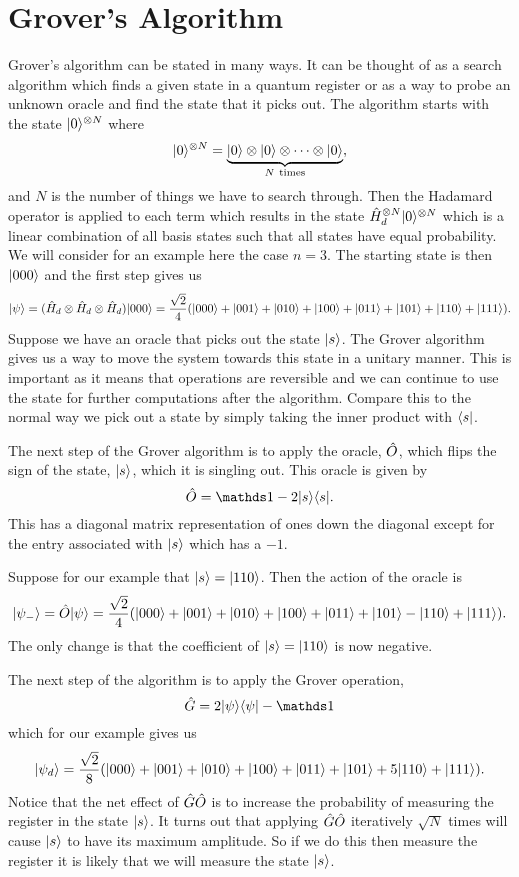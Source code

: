     \section{Grover's Algorithm}
    Grover's algorithm can be stated in many ways.
    It can be thought of as a search algorithm which finds a given state in a quantum register or as a way to probe an unknown oracle and find the state that it picks out.
    The algorithm starts with the state \(\vert {0} \rangle^{\otimes N}\) where
    \[\vert {0} \rangle^{\otimes N} = \underbrace{\vert {0} \rangle\otimes\vert {0} \rangle \otimes\dotsb\otimes \vert {0} \rangle}_{N~\text{times}},\]
    and \(N\) is the number of things we have to search through.
    Then the Hadamard operator is applied to each term which results in the state \(\hat{H}_d^{\otimes N} \vert {0} \rangle^{\otimes N}\) which is a linear combination of all basis states such that all states have equal probability.
    We will consider for an example here the case \(n = 3\).
    The starting state is then \(\vert {000} \rangle\) and the first step gives us
    \[\vert {\psi} \rangle = (\hat{H}_d\otimes \hat{H}_d\otimes \hat{H}_d)\vert {000} \rangle = \frac{\sqrt{2}}{4}(\vert {000} \rangle + \vert {001} \rangle + \vert {010} \rangle + \vert {100} \rangle + \vert {011} \rangle + \vert {101} \rangle + \vert {110} \rangle + \vert {111} \rangle).\]
    Suppose we have an oracle that picks out the state \(\vert {s} \rangle\).
    The Grover algorithm gives us a way to move the system towards this state in a unitary manner.
    This is important as it means that operations are reversible and we can continue to use the state for further computations after the algorithm.
    Compare this to the normal way we pick out a state by simply taking the inner product with \(\langle {s} \vert\).
    
    The next step of the Grover algorithm is to apply the oracle, \(\hat{O}\), which flips the sign of the state, \(\vert {s} \rangle\), which it is singling out.
    This oracle is given by
    \[\operator{O} = \ident - 2\ketbra{s}{s}.\]
    This has a diagonal matrix representation of ones down the diagonal
    except for the entry associated with \(\vert {s} \rangle\) which has a \(-1\).
    
    Suppose for our example that \(\vert {s} \rangle = \vert {110} \rangle\).
    Then the action of the oracle is
    \[\vert {\psi_-} \rangle = \hat{O}\vert {\psi} \rangle = \frac{\sqrt{2}}{4}(\vert {000} \rangle + \vert {001} \rangle + \vert {010} \rangle + \vert {100} \rangle + \vert {011} \rangle + \vert {101} \rangle - \vert {110} \rangle + \vert {111} \rangle).\]
    The only change is that the coefficient of \(\vert {s} \rangle = \vert {110} \rangle\) is now negative.
    
    The next step of the algorithm is to apply the Grover operation,
    \[\operator{G} = 2\ketbra{\psi}{\psi} - \ident\]
    which for our example gives us
    \[\vert {\psi_d} \rangle = \frac{\sqrt{2}}{8}(\vert {000} \rangle + \vert {001} \rangle + \vert {010} \rangle + \vert {100} \rangle + \vert {011} \rangle + \vert {101} \rangle + 5\vert {110} \rangle + \vert {111} \rangle).\]
    Notice that the net effect of \(\hat{G}\hat{O}\) is to increase the probability of measuring the register in the state \(\vert {s} \rangle\).
    It turns out that applying \(\hat{G}\hat{O}\) iteratively \(\sqrt{N}\) times will cause \(\vert {s} \rangle\) to have its maximum amplitude.
    So if we do this then measure the register it is likely that we will measure the state \(\vert {s} \rangle\).
    
